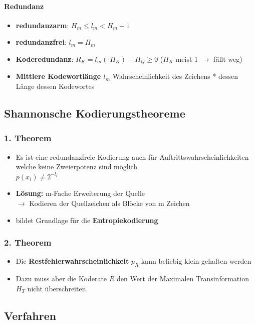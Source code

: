 \documentclass[12pt,a4paper]{article}
\begin{document}
\paragraph{Redundanz\\}
\begin{itemize}
\item \textbf{redundanzarm}: $H_m \leq l_m < H_m + 1$
\item \textbf{redundanzfrei}: $l_m = H_m$
\item \textbf{Koderedundanz}: $R_K = l_m (\cdot H_K) - H_Q \geq 0$ ($H_K$ meist 1 $\rightarrow$ fällt weg)
\item \textbf{Mittlere Kodewortlänge $l_m$} Wahrscheinlichkeit des Zeichens * dessen Länge dessen Kodewortes
\end{itemize}

\subsection{Shannonsche Kodierungstheoreme}
\subsubsection{1. Theorem}
\begin{itemize}
\item Es ist eine redundanzfreie Kodierung auch für Auftrittswahrscheinlichkeiten welche keine Zweierpotenz sind möglich\\
$p(x_i) \neq 2^{-l_i}$
\item \textbf{Lösung:} m-Fache Erweiterung der Quelle\\
$\rightarrow$ Kodieren der Quellzeichen als Blöcke von m Zeichen
\item bildet Grundlage für die \textbf{Entropiekodierung}
\end{itemize}
\subsubsection{2. Theorem}
\begin{itemize}
\item Die \textbf{Restfehlerwahrscheinlichkeit} $p_R$ kann beliebig klein gehalten werden
\item Dazu muss aber die Koderate $R$ den Wert der Maximalen Transinformation $H_T$ nicht überschreiten
\end{itemize}

\subsection{Verfahren}
\end{document}
